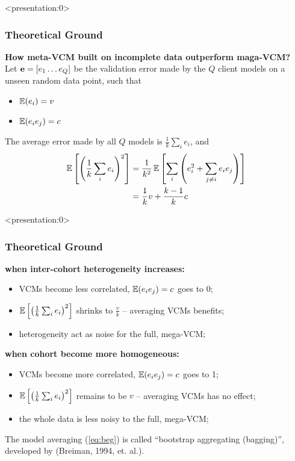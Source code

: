 \documentclass{beamer}
\begin{document}
\begin{frame} <presentation:0> %
  \frametitle{Theoretical Ground} %
  \textbf{How meta-VCM built on incomplete data outperform maga-VCM?} \\
  Let $\mathbf{e}=[e_1 \dots e_Q]$ be the validation error made by the $Q$
  client models on a unseen random data point, such that
  \begin{itemize}
  \item $\operatorname{\mathbb{E}}(e_i) = v$
  \item $\operatorname{\mathbb{E}}(e_i e_j) = c$
  \end{itemize}
  The average error made by all $Q$ models is $\frac{1}{k}\sum_i e_i$,
  and
  \begin{align} \label{eq:beg} \operatorname{\mathbb{E}}\left[ \left(\frac{1}{k}\sum_i
        e_i\right)^2 \right]
    &= \frac{1}{k^2}\operatorname{\mathbb{E}}\left[\sum_i \left(e_i^2 + \sum_{j \ne i}e_ie_j \right)  \right] \\
    &= \frac{1}{k}v + \frac{k-1}{k}c
  \end{align}
\end{frame}
\begin{frame} <presentation:0>%
  \frametitle{Theoretical Ground}%
  \textbf{when inter-cohort heterogeneity increases:}
  \begin{itemize}
  \item VCMs become less correlated, $\operatorname{\mathbb{E}}(e_i e_j) = c$ goes to 0;
  \item $\operatorname{\mathbb{E}}\left[ \left(\frac{1}{k}\sum_i e_i\right)^2 \right]$
    shrinks to $\frac{v}{k}$ -- averaging VCMs benefits;
  \item heterogeneity act as noise for the full, mega-VCM;
  \end{itemize}
  \textbf{when cohort become more homogeneous:}
  \begin{itemize}
  \item VCMs become more correlated, $\operatorname{\mathbb{E}}(e_i e_j) = c$ goes to 1;
  \item $\operatorname{\mathbb{E}}\left[ \left(\frac{1}{k}\sum_i e_i\right)^2 \right]$
    remains to be $v$ -- averaging VCMs has no effect;
  \item the whole data is less noisy to the full, mega-VCM;
  \end{itemize}
  The model averaging (\ref{eq:beg}) is called ``bootstrap aggregating
  (bagging)'', developed by (Breiman, 1994, et. al.).
\end{frame}
\end{document}
